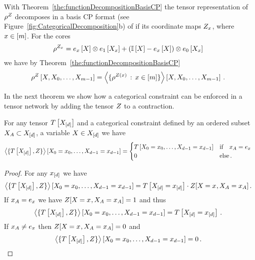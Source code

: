 With Theorem~\ref{the:functionDecompositionBasisCP} the tensor representation of $\rho^{Z}$ decomposes in a basis CP format (see Figure~\ref{fig:CategoricalDecomposition}b) of if its coordinate maps $Z_{x}$, where $x\in[m]$.
For the cores
\begin{align}
	\rho^{Z_{x}} = e_{x}\left[X\right] \otimes e_{1}\left[X_{x}\right] + (\mathbb{I}\left[X\right]- e_{x}\left[X\right] ) \otimes e_{0}\left[X_{x}\right] 
\end{align}	
we have by Theorem~\ref{the:functionDecompositionBasisCP}
\begin{align*}
	\rho^{Z}\left[X, X_{0}, \ldots, X_{m-1}\right] 
	= \left\langle \{\rho^{Z(x)} \, : \, x\in[m]\}\right\rangle \left[ X, X_{0}, \ldots, X_{m-1} \right] \, . 
\end{align*}


In the next theorem we show how a categorical constraint can be enforced in a tensor network by adding the tensor $Z$ to a contraction.

\begin{theorem}
	For any tensor $T\left[X_{[d]}\right]$ and a categorical constraint defined by an ordered subset $X_{A}\subset X_{[d]}$, a variable $X\in X_{[d]}$ we have
	\begin{align*}
	 	\left\langle \{T\left[X_{[d]}\right], Z\}\right\rangle \left[ X_{0}=x_{0},\ldots,X_{d-1}=x_{d-1} \right] 
		= \begin{cases}
			T\left[X_{0}=x_{0},\ldots,X_{d-1}=x_{d-1}\right] & \text{if} \quad x_{A} = e_{x} \\
			0 & \text{else} \, . 
		\end{cases}
	\end{align*}
\end{theorem}
\begin{proof}
	For any $x_{[d]}$ we have
		\[ \left\langle \{T\left[X_{[d]}\right], Z\}\right\rangle \left[ X_{0}=x_{0},\ldots,X_{d-1}=x_{d-1} \right]  = 
			T\left[X_{[d]}=x_{[d]}\right] \cdot Z[X_{}=x_{},X_{A}=x_{A}] \, . 
		\]
	If $x_{A} = e_{x}$ we have $Z[X_{}=x_{},X_{A}=x_{A}] = 1$ and thus
		\[ \left\langle \{T\left[X_{[d]}\right], Z\}\right\rangle \left[ X_{0}=x_{0},\ldots,X_{d-1}=x_{d-1} \right]  =  T\left[X_{[d]}=x_{[d]}\right]  \, . \]
	If $x_{A} \neq e_{x}$ then $Z[X_{}=x_{},X_{A}=x_{A}] = 0$ and  
		\[ \left\langle \{T\left[X_{[d]}\right], Z\}\right\rangle \left[ X_{0}=x_{0},\ldots,X_{d-1}=x_{d-1} \right]  = 0 \, . \]
\end{proof}




